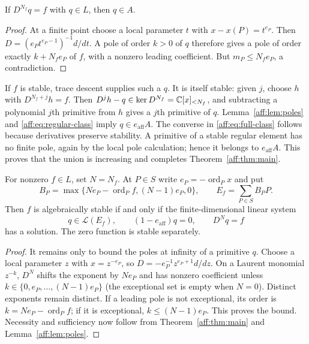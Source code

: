 \begin{lemma}\label{aff:lem:poles}
If $D^{N_f}q=f$ with $q\in L$, then $q\in A$.
\end{lemma}
\begin{proof}
At a finite point choose a local parameter $t$ with
$x-x(P)=t^{e_P}$. Then
$D=(e_Pt^{e_P-1})^{-1}d/dt$. A pole of order $k>0$ of $q$ therefore gives
a pole of order exactly $k+N_fe_P$ of $f$, with a nonzero leading
coefficient. But $m_P\le N_fe_P$, a contradiction.
\end{proof}

If $f$ is stable, trace descent supplies such a $q$. It is itself stable:
given $j$, choose $h$ with $D^{N_f+j}h=f$. Then
$D^jh-q\in\ker D^{N_f}=\mathbb C[x]_{<N_f}$, and subtracting a polynomial
$j$th primitive from $h$ gives a $j$th primitive of $q$.
Lemma~\ref{aff:lem:poles} and \eqref{aff:eq:regular-class} imply $q\in e_{\mathrm{aff}}A$.
The converse in \eqref{aff:eq:full-class} follows because derivatives preserve
stability. A primitive of a stable regular element has no finite pole, again
by the local pole calculation; hence it belongs to $e_{\mathrm{aff}}A$. This proves that
the union is increasing and completes Theorem~\ref{aff:thm:main}.

\begin{theorem}\label{aff:thm:finite}
For nonzero $f\in L$, set $N=N_f$. At $P\in S$ write $e_P=-\operatorname{ord}_Px$ and put
\[
 B_P=\max\{Ne_P-\operatorname{ord}_Pf,(N-1)e_P,0\},\qquad
 E_f=\sum_{P\in S}B_PP.
\]
Then $f$ is algebraically stable if and only if the finite-dimensional linear
system
\begin{equation}\label{aff:eq:finite-system}
 q\in\mathcal L(E_f),\qquad (1-e_{\mathrm{aff}})q=0,\qquad D^Nq=f
\end{equation}
has a solution. The zero function is stable separately.
\end{theorem}
\begin{proof}
It remains only to bound the poles at infinity of a primitive $q$. Choose
a local parameter $z$ with $x=z^{-e_P}$, so
$D=-e_P^{-1}z^{e_P+1}d/dz$. On a Laurent monomial $z^{-k}$, $D^N$ shifts
the exponent by $Ne_P$ and has nonzero coefficient unless
$k\in\{0,e_P,\ldots,(N-1)e_P\}$ (the exceptional set is empty when $N=0$).
Distinct exponents remain distinct.
If a leading pole is not exceptional, its order is
$k=Ne_P-\operatorname{ord}_Pf$; if it is exceptional, $k\le(N-1)e_P$.
This proves the bound. Necessity and sufficiency now follow from
Theorem~\ref{aff:thm:main} and Lemma~\ref{aff:lem:poles}.
\end{proof}

